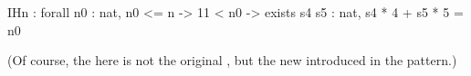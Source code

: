 \begin{coq}{}{}
IHn : forall n0 : nat,
      n0 <= n ->
      11 < n0 -> exists s4 s5 : nat, s4 * 4 + s5 * 5 = n0
\end{coq}

(Of course, the  here is not the original , but the new
 introduced in the \C{=>[|n IHn]} pattern.)



